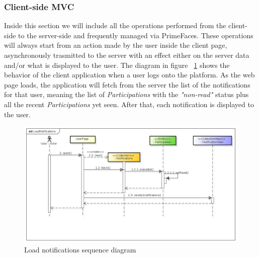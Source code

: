 \subsubsection{Client-side MVC}
Inside this section we will include all the operations performed from the client-side to the server-side and frequently managed via PrimeFaces. These operations will always start from an action made by the user inside the client page, asynchronously trasmitted to the server with an effect either on the server data and/or what is displayed to the user.
The diagram in figure ~\ref{fig:loadnotifSeq} shows the behavior of the client application when a user logs onto the platform. As the web page loads, the application will fetch from the server the list of the notifications for that user, meaning the list of \textit{Participations} with the \textit{"non-read"} status plus all the recent \textit{Participations} yet seen. After that, each notification is displayed to the user.
 \begin{center}
 \begin{figure}[H]
    \includegraphics[width=1\textwidth]{./BCEDiagram/BCE/EntityOverview/LoadNotifications.png}
    \caption{Load notifications sequence diagram}
     \label{fig:loadnotifSeq}
     \end{figure}
   \end{center} 
   
